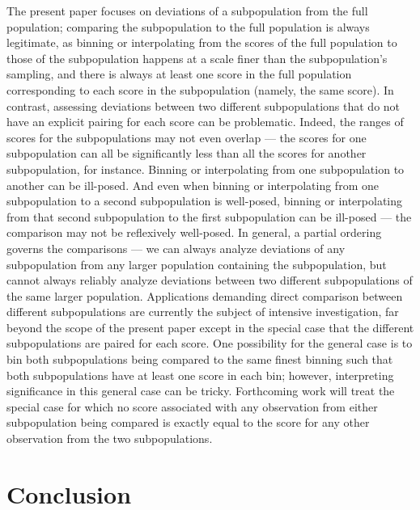 \documentclass{article}
\begin{document}
The present paper focuses on deviations of a subpopulation
from the full population; comparing the subpopulation to the full population
is always legitimate, as binning or interpolating from the scores
of the full population to those of the subpopulation happens at a scale
finer than the subpopulation's sampling, and there is always at least one score
in the full population corresponding to each score in the subpopulation
(namely, the same score). In contrast, assessing deviations
between two different subpopulations that do not have an explicit pairing
for each score can be problematic. Indeed, the ranges of scores
for the subpopulations may not even overlap ---
the scores for one subpopulation can all be significantly
less than all the scores for another subpopulation, for instance.
Binning or interpolating from one subpopulation to another can be ill-posed.
And even when binning or interpolating from one subpopulation
to a second subpopulation is well-posed, binning or interpolating
from that second subpopulation to the first subpopulation can be ill-posed
--- the comparison may not be reflexively well-posed. In general,
a partial ordering governs the comparisons --- we can always analyze deviations
of any subpopulation from any larger population containing the subpopulation,
but cannot always reliably analyze deviations between two different
subpopulations of the same larger population.
Applications demanding direct comparison between different subpopulations
are currently the subject of intensive investigation,
far beyond the scope of the present paper
except in the special case that the different subpopulations are paired
for each score. One possibility for the general case is to bin
both subpopulations being compared to the same finest binning such that
both subpopulations have at least one score in each bin;
however, interpreting significance in this general case can be tricky.
Forthcoming work will treat the special case for which no score
associated with any observation from either subpopulation being compared
is exactly equal to the score for any other observation
from the two subpopulations.



\section{Conclusion}
\label{conclusion}
\end{document}
